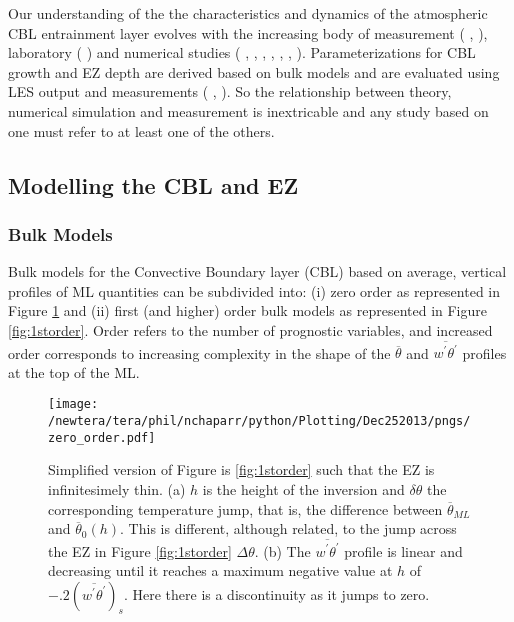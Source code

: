 Our understanding of the the characteristics and dynamics of the atmospheric \acs{CBL} entrainment layer evolves with the increasing body of measurement (\citeauthor{Traum11} \citeyear{Traum11}, \citeauthor{StullNelEl} \citeyear{StullNelEl}), laboratory (\citeauthor{DearWill80} \citeyear{DearWill80}) and numerical studies (\citeauthor{Deardorff72} \citeyear{Deardorff72}, \citeauthor{Sorbjan1} \citeyear{Sorbjan1}, \citeauthor{SullMoengStev} \citeyear{SullMoengStev}, \citeauthor{EbSchu} \citeyear{EbSchu}, \citeauthor{FedConzMir04} \citeyear{FedConzMir04}, \citeauthor{BrooksFowler2} \citeyear{BrooksFowler2}, \citeauthor{GarciaMellado} \citeyear{GarciaMellado}). Parameterizations for \acs{CBL} growth and \acs{EZ} depth are derived based on bulk models and are evaluated using \acs{LES} output and measurements (\citeauthor{FedConzMir04} \citeyear{FedConzMir04}, \citeauthor{Boers89} \citeyear{Boers89}).  So the relationship between theory, numerical simulation and measurement is inextricable and any study based on one must refer to at least one of the others.\\  

\subsection{Modelling the CBL and EZ}
\label{subsec:}

\subsubsection{Bulk Models}
\label{subsubsec:}
Bulk  models for the Convective Boundary layer (\acs{CBL}) based on average, vertical profiles of \acs{ML} quantities can be subdivided into: (i) zero order as represented in Figure \ref{fig:0order} and (ii) first (and higher) order bulk models as represented in Figure \ref{fig:1storder}. Order refers to the number of prognostic variables, and increased order corresponds to increasing complexity in the shape of the  $\overline{\theta}$ and $\overline{w^{'}\theta^{'}}$ profiles at the top of the \acs{ML}.\\

\begin{figure}[htbp]
    \centering
    \texttt{[image: /newtera/tera/phil/nchaparr/python/Plotting/Dec252013/pngs/zero\_order.pdf]}
    \caption[Zero order \acs{CBL}]{Simplified version of Figure is \ref{fig:1storder} such that the \acs{EZ} is infinitesimely thin. (a) $h$ is the height of the  inversion and $\delta \theta$ the corresponding temperature jump, that is, the difference between $\overline{\theta}_{ML}$ and $\overline{\theta}_{0}(h)$. This is different, although related, to the jump across the \acs{EZ} in Figure \ref{fig:1storder} $\Delta \theta$. (b) The $\overline{w^{'}\theta^{'}}$ profile is linear and decreasing until it reaches a maximum negative value at $h$ of $-.2(\overline{w^{'}\theta^{'}})_{s}$. Here there is a discontinuity as it jumps to zero.}
    \label{fig:0order}   %
\end{figure}

